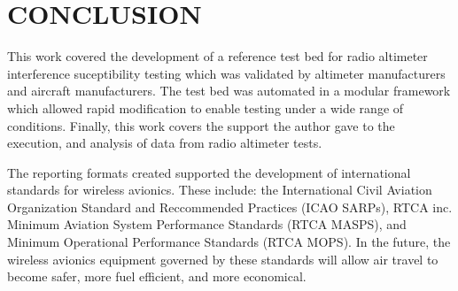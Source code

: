 %
%
%
%



\chapter{CONCLUSION \label{cha:Summary}}

This work covered the development of a reference test bed for radio altimeter interference suceptibility testing which was validated by altimeter manufacturers and aircraft manufacturers. The test bed was automated in a modular framework which allowed rapid modification to enable testing under a wide range of conditions. Finally, this work covers the support the author gave to the execution, and analysis of data from radio altimeter tests. 

The reporting formats created supported the development of international standards for wireless avionics. These include: the International Civil Aviation Organization Standard and Reccommended Practices (ICAO SARPs), RTCA inc. Minimum Aviation System Performance Standards (RTCA MASPS), and Minimum Operational Performance Standards (RTCA MOPS).  In the future, the wireless avionics equipment governed by these standards will allow air travel to become safer, more fuel efficient, and more economical. 